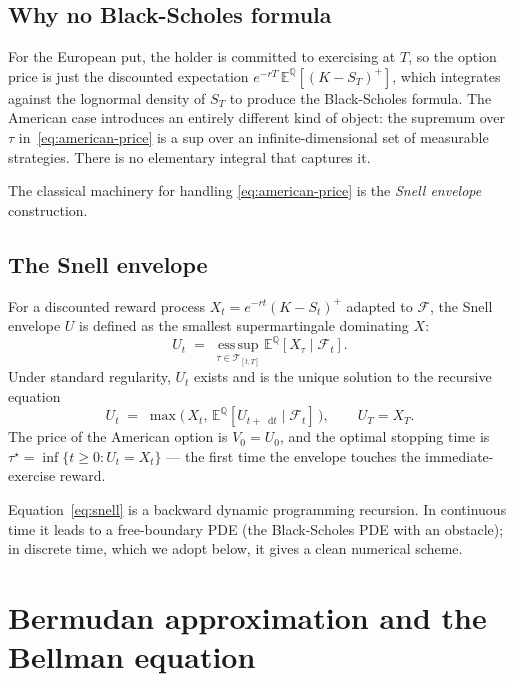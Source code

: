 \documentclass[11pt,a4paper]{article}
\theoremstyle{plain}
\theoremstyle{definition}
\theoremstyle{remark}
\newcommand{\E}{\mathbb{E}}
\newcommand{\F}{\mathcal{F}}
\newcommand{\Q}{\mathbb{Q}}
\newcommand{\Tcal}{\mathcal{T}}
\newcommand{\dd}{\mathop{}\!\mathrm{d}}
\newcommand{\esssup}{\operatorname*{ess\,sup}}
\begin{document}
\subsection{Why no Black-Scholes formula}

For the European put, the holder is committed to exercising at $T$,
so the option price is just the discounted expectation
$e^{-rT}\,\E^\Q[(K - S_T)^+]$, which integrates against the lognormal
density of $S_T$ to produce the Black-Scholes formula. The American
case introduces an entirely different kind of object: the supremum
over $\tau$ in~\eqref{eq:american-price} is a sup over an
infinite-dimensional set of measurable strategies. There is no
elementary integral that captures it.

The classical machinery for handling \eqref{eq:american-price} is the
\emph{Snell envelope} construction.

\subsection{The Snell envelope}

For a discounted reward process $X_t = e^{-rt} (K - S_t)^+$ adapted
to $\F$, the Snell envelope $U$ is defined as the smallest
supermartingale dominating $X$:
\begin{equation}
U_t \;=\; \esssup_{\tau \in \Tcal_{[t, T]}} \E^\Q[X_\tau \mid \F_t].
\end{equation}
Under standard regularity, $U_t$ exists and is the unique solution to
the recursive equation
\begin{equation}
U_t \;=\; \max\!\bigl(\, X_t,\, \E^\Q[U_{t+\dd t} \mid \F_t]\, \bigr),
\qquad U_T = X_T.
\label{eq:snell}
\end{equation}
The price of the American option is $V_0 = U_0$, and the optimal
stopping time is $\tau^\star = \inf\{ t \ge 0 : U_t = X_t \}$ --- the
first time the envelope touches the immediate-exercise reward.

Equation~\eqref{eq:snell} is a backward dynamic programming
recursion. In continuous time it leads to a free-boundary PDE (the
Black-Scholes PDE with an obstacle); in discrete time, which we
adopt below, it gives a clean numerical scheme.

\section{Bermudan approximation and the Bellman equation}
\label{sec:bermudan}
\end{document}
